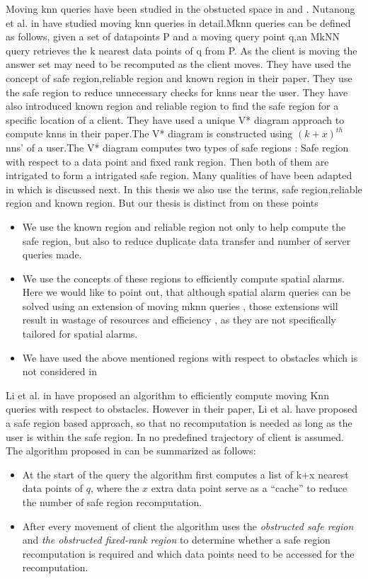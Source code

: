 Moving knn queries have been studied in the obstucted space in \cite{mknn} and \cite{obst7}. Nutanong et al. in \cite{mknn} have studied moving knn queries in detail.Mknn queries can be defined as follows, given a set of datapoints P and a moving query point q,an MkNN query retrieves the k nearest data points of q from P. As the client is moving the answer set may need to be recomputed as the client moves. They have used the concept of safe region,reliable region and known region in their paper. They use the safe region to reduce unnecessary checks for knns near the user. They have also introduced known region and reliable region to find the safe region for a specific location of a client. They have used a unique V* diagram approach to compute knns in their paper.The V* diagram is constructed using $(k+x)^{th}$ nns' of a user.The V* diagram computes two types of safe regions : Safe region with respect to a data point and fixed rank region. Then both of them are intrigated to form a intrigated safe region. Many qualities of\cite{mknn} have been adapted in \cite{oknn} which is discussed next. In this thesis we also use the terms, safe region,reliable region and known region. But our thesis is distinct from \cite{mknn} on these points 
\begin{itemize}
\item We use the known region and reliable region not only to help compute the safe region, but also to reduce duplicate data transfer and number of server queries made.
\item We use the concepts of these regions to efficiently compute spatial alarms. Here we would like to point out, that although spatial alarm queries can be solved using an extension of moving mknn queries , those extensions will result in wastage of resources and efficiency , as they are not specifically tailored for spatial alarms.
\item We have used the above mentioned regions with respect to obstacles which is not considered in \cite{mknn} 
\end{itemize} 

Li et al. in \cite{oknn} have proposed an algorithm to efficiently compute moving Knn queries with respect to obstacles.  However in their paper, Li et al. have proposed a safe region based approach, so that no recomputation is needed as long as the user is within the safe region. In \cite{oknn} no predefined trajectory of client is assumed. The algorithm proposed in \cite{oknn} can be summarized as follows:
\begin{itemize}
\item At the start of the query the algorithm first computes a  list of k+x nearest data points of $q$, where the $x$ extra data point serve as a “cache” to reduce the number of safe region recomputation.
\item After every movement of client the algorithm uses the \textit{obstructed safe region} and \textit{the obstructed fixed-rank region} to determine whether a safe region recomputation is required and which data points need to be accessed for the recomputation.
\end{itemize}


